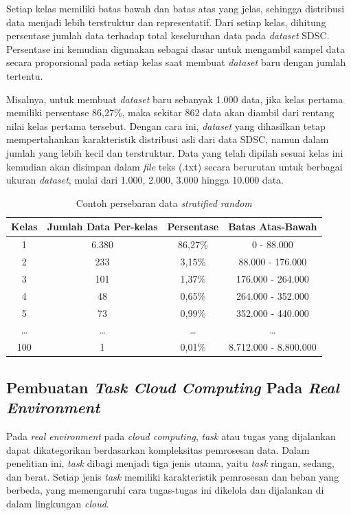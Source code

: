 Setiap kelas memiliki batas bawah dan batas atas yang jelas, sehingga distribusi data menjadi lebih terstruktur dan representatif. Dari setiap kelas, dihitung persentase jumlah data terhadap total keseluruhan data pada \textit{dataset} SDSC. Persentase ini kemudian digunakan sebagai dasar untuk mengambil sampel data secara proporsional pada setiap kelas saat membuat \textit{dataset} baru dengan jumlah tertentu.

Misalnya, untuk membuat \textit{dataset} baru sebanyak 1.000 data, jika kelas pertama memiliki persentase 86,27\%, maka sekitar 862 data akan diambil dari rentang nilai kelas pertama tersebut. Dengan cara ini, \textit{dataset} yang dihasilkan tetap mempertahankan karakteristik distribusi asli dari data SDSC, namun dalam jumlah yang lebih kecil dan terstruktur. Data yang telah dipilah sesuai kelas ini kemudian akan disimpan dalam \textit{file} teks (.txt) secara berurutan untuk berbagai ukuran \textit{dataset}, mulai dari 1.000, 2.000, 3.000 hingga 10.000 data.

\newpage

\begin{table} [H]
    \centering
    \caption{Contoh persebaran data \textit{stratified random}}
    \renewcommand{\arraystretch}{1.2}
    \begin{tabular}{|c|c|c|c|}
    \hline
    \textbf{Kelas} & \textbf{Jumlah Data Per-kelas} & \textbf{Persentase} & \textbf{Batas Atas-Bawah} \\
    \hline
    1   & 6.380 & 86,27\% & 0 - 88.000 \\
    2   & 233   & 3,15\%  & 88.000 - 176.000 \\
    3   & 101   & 1,37\%  & 176.000 - 264.000 \\
    4   & 48    & 0,65\%  & 264.000 - 352.000 \\
    5   & 73    & 0,99\%  & 352.000 - 440.000 \\
    \multicolumn{1}{|c|}{\dots} & \multicolumn{1}{c|}{\dots} & \multicolumn{1}{c|}{\dots} &     \multicolumn{1}{c|}{\dots} \\
    100 & 1    & 0,01\%  & 8.712.000 - 8.800.000 \\
    \hline
    \end{tabular}
\end{table}

\subsection{Pembuatan \textit{Task Cloud Computing} Pada \textit{Real Environment}}
Pada \textit{real environment} pada \textit{cloud computing}, \textit{task} atau tugas yang dijalankan dapat dikategorikan berdasarkan kompleksitas pemrosesan data. Dalam penelitian ini, \textit{task} dibagi menjadi tiga jenis utama, yaitu \textit{task} ringan, sedang, dan berat. Setiap jenis \textit{task} memiliki karakteristik pemrosesan dan beban yang berbeda, yang memengaruhi cara tugas-tugas ini dikelola dan dijalankan di dalam lingkungan \textit{cloud}.

